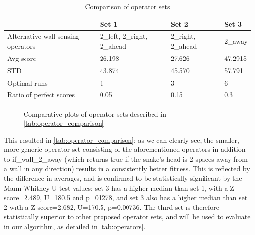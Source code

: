 \documentclass[british,10pt,a4paper]{article}
\begin{document}
\begin{table}[h]
	\centering
	\begin{tabular}{|l|l|l|l|}
	\hline
	 & Set 1 & Set 2 & Set 3 \\ \hline
	Alternative wall sensing operators & 2\_left, 2\_right, 2\_ahead & 2\_right, 2\_ahead & 2\_away \\ \hline
	Avg score & 26.198 & 27.626 & 47.2915 \\ \hline
	STD & 43.874 & 45.570 & 57.791 \\ \hline
	Optimal runs & 1 & 3 & 6 \\ \hline
	Ratio of perfect scores & 0.05 & 0.15 & 0.3 \\ \hline
	\end{tabular}
	\caption{Comparison of operator sets}
	\label{tab:operator_comparison}
\end{table}
\begin{figure}
  \vspace{-20pt}
  \begin{center}
	  \vspace{-5pt}
		\caption{Comparative plots of operator sets described in \autoref{tab:operator_comparison}}
		\label{fig:box_plot_operators}
	  \vspace{-10pt}
	  \end{center}
\end{figure}
This resulted in \autoref{tab:operator_comparison}: as we can clearly see, the smaller, more generic operator set consisting of the aforementioned operators in addition to if\_wall\_2\_away (which returns true if the snake's head is 2 spaces away from a wall in any direction) results in a consistently better fitness. This is reflected by the difference in averages, and is confirmed to be statistically significant by the Mann-Whitney U-test values: set 3 has a higher median than set 1, with a Z-score=2.489, U=180.5 and p=01278, and set 3 also has a higher median than set 2 with a Z-score=2.682, U=170.5, p=0.00736. The third set is therefore statistically superior to other proposed operator sets, and will be used to evaluate in our algorithm, as detailed in \autoref{tab:operators}.
\end{document}

